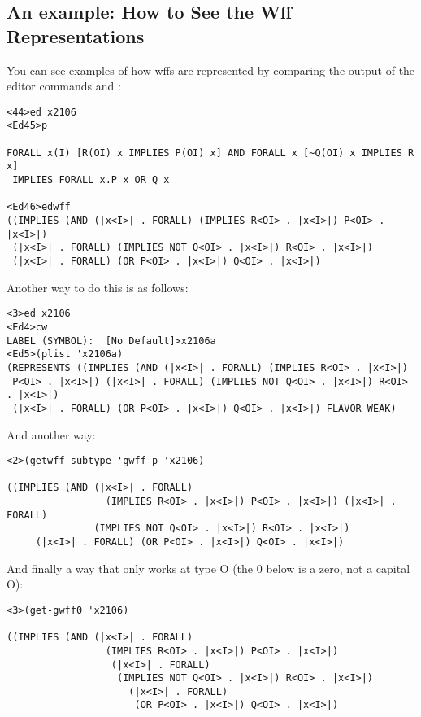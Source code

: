 \subsection{An example: How to See the Wff Representations}

You can see examples of how wffs are represented by comparing the output 
of the editor commands  and :

\begin{verbatim}
<44>ed x2106
<Ed45>p

FORALL x(I) [R(OI) x IMPLIES P(OI) x] AND FORALL x [~Q(OI) x IMPLIES R x]
 IMPLIES FORALL x.P x OR Q x

<Ed46>edwff
((IMPLIES (AND (|x<I>| . FORALL) (IMPLIES R<OI> . |x<I>|) P<OI> . |x<I>|) 
 (|x<I>| . FORALL) (IMPLIES NOT Q<OI> . |x<I>|) R<OI> . |x<I>|) 
 (|x<I>| . FORALL) (OR P<OI> . |x<I>|) Q<OI> . |x<I>|)
\end{verbatim}

Another way to do this is as follows:

\begin{verbatim}
<3>ed x2106
<Ed4>cw
LABEL (SYMBOL):  [No Default]>x2106a
<Ed5>(plist 'x2106a)
(REPRESENTS ((IMPLIES (AND (|x<I>| . FORALL) (IMPLIES R<OI> . |x<I>|) 
 P<OI> . |x<I>|) (|x<I>| . FORALL) (IMPLIES NOT Q<OI> . |x<I>|) R<OI> . |x<I>|) 
 (|x<I>| . FORALL) (OR P<OI> . |x<I>|) Q<OI> . |x<I>|) FLAVOR WEAK)
\end{verbatim}

And another way:

\begin{verbatim}
<2>(getwff-subtype 'gwff-p 'x2106) 

((IMPLIES (AND (|x<I>| . FORALL) 
                 (IMPLIES R<OI> . |x<I>|) P<OI> . |x<I>|) (|x<I>| . FORALL)
               (IMPLIES NOT Q<OI> . |x<I>|) R<OI> . |x<I>|) 
     (|x<I>| . FORALL) (OR P<OI> . |x<I>|) Q<OI> . |x<I>|)
\end{verbatim}

And finally a way that only works at type O (the 0 below is a zero, not a capital O):

\begin{verbatim}
<3>(get-gwff0 'x2106)

((IMPLIES (AND (|x<I>| . FORALL) 
                 (IMPLIES R<OI> . |x<I>|) P<OI> . |x<I>|)
                  (|x<I>| . FORALL)
                   (IMPLIES NOT Q<OI> . |x<I>|) R<OI> . |x<I>|) 
                     (|x<I>| . FORALL)
                      (OR P<OI> . |x<I>|) Q<OI> . |x<I>|)
\end{verbatim}
